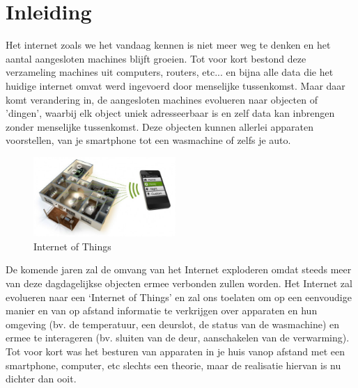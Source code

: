 \chapter{Inleiding}

Het internet zoals we het vandaag kennen is niet meer weg te denken en het aantal aangesloten machines blijft groeien. Tot voor kort bestond deze verzameling machines uit computers, routers, etc... en bijna alle data die het huidige internet omvat werd ingevoerd door menselijke tussenkomst.
Maar daar komt verandering in, de aangesloten machines evolueren naar objecten of 'dingen', waarbij elk object uniek adresseerbaar is en zelf data kan inbrengen zonder menselijke tussenkomst. Deze objecten kunnen allerlei apparaten voorstellen, van je smartphone tot een wasmachine of zelfs je auto.\\

\begin{figure}
\vspace{-10pt}
\includegraphics[width=0.48\textwidth]{fig/InternetOfThings}
\vspace{-10pt}
\caption{Internet of Things}
\vspace{-10pt}
\end{figure}
De komende jaren zal de omvang van het Internet exploderen omdat steeds meer van deze dagdagelijkse objecten ermee verbonden zullen worden. Het Internet zal evolueren naar een ‘Internet of Things’ en zal ons toelaten om op een eenvoudige manier en van op afstand informatie te verkrijgen over apparaten en hun omgeving (bv. de temperatuur, een deurslot, de status van de wasmachine) en ermee te interageren (bv. sluiten van de deur, aanschakelen van de verwarming). Tot voor kort was het besturen van apparaten in je huis vanop afstand met een smartphone, computer, etc slechts een theorie, maar de realisatie hiervan is nu dichter dan ooit.

